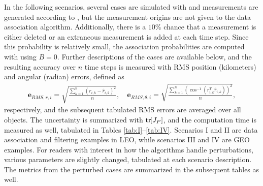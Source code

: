 In the following scenarios, several cases are simulated with  and measurements are generated according to , but the measurement origins are not given to the data association algorithm.
Additionally, there is a $10\%$ chance that a measurement is either deleted or an extraneous measurement is added at each time step.
Since this probability is relatively small, the association probabilities are computed with  using $B=0$.
Further descriptions of the cases are available below, and the resulting accuracy over $n$ time steps is measured with RMS position (kilometers) and angular (radian) errors, defined as
\begin{align}
\mathbf{e}_{RMS,r,i}=\sqrt{\frac{\sum_{k=1}^n(r_{i,k}-\hat r_{i,k})^2}{n}}
, \quad
\mathbf{e}_{RMS,\theta,i}=\sqrt{\frac{\sum_{k=1}^n(\cos^{-1}(r_{i,k}^T\hat r_{i,k}))^2}{n}}
,
\end{align}
respectively, and the subsequent tabulated RMS errors are averaged over all objects. The uncertainty is summarized with $\mathrm{tr}\negthickspace\left[ J_P \right]$, and the computation time is measured as well, tabulated in Tables \ref{tab:I}--\ref{tab:IV}.
Scenarios I and II are data association and filtering examples in LEO, while scenarios III and IV are GEO examples.
For readers with interest in how the algorithms handle perturbations, various parameters are slightly changed, tabulated at each scenario description.
The metrics from the perturbed cases are summarized in the subsequent tables as well.


